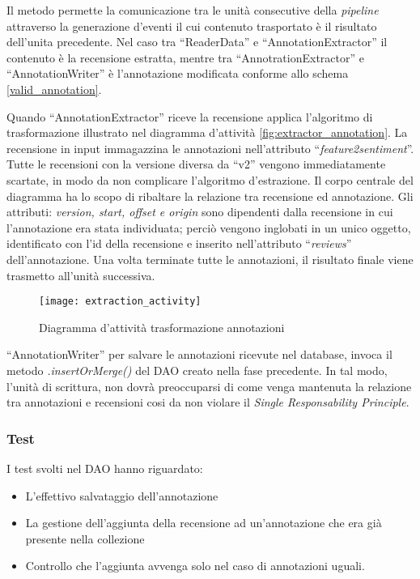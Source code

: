 Il metodo permette la comunicazione tra le unità consecutive della
\textit{pipeline} attraverso la generazione d'eventi il cui contenuto
trasportato è il risultato dell'unita precedente. Nel caso tra ``ReaderData'' e
``AnnotationExtractor'' il contenuto è la recensione estratta, mentre tra
``AnnotrationExtractor'' e ``AnnotationWriter'' è l'annotazione modificata
conforme allo schema \ref{valid_annotation}.

Quando ``AnnotationExtractor'' riceve la recensione applica l'algoritmo di
trasformazione illustrato nel diagramma d'attività
\ref{fig:extractor_annotation}. La recensione in input immagazzina le
annotazioni nell'attributo ``\textit{feature2sentiment}''. Tutte le recensioni
con la versione diversa da ``v2'' vengono immediatamente scartate, in modo da
non complicare l'algoritmo d'estrazione. Il corpo centrale del diagramma ha lo
scopo di ribaltare la relazione tra recensione ed annotazione. Gli attributi:
\textit{version, start, offset e origin} sono dipendenti dalla recensione in
cui l'annotazione era stata individuata; perciò vengono inglobati in un unico
oggetto, identificato con l'id della recensione e inserito nell'attributo
``\textit{reviews}'' dell'annotazione. Una volta terminate tutte le annotazioni,
il risultato finale viene trasmetto all'unità successiva.

\begin{figure}[H]
\begin{center}
\texttt{[image: extraction\_activity]}
\caption{
Diagramma d'attività trasformazione annotazioni
}
\label{fig:extraction_activity}
\end{center}
\end{figure}

``AnnotationWriter'' per salvare le annotazioni ricevute nel database, invoca il
metodo \textit{.insertOrMerge()} del \gls{DAO} creato nella fase precedente. In
tal modo, l'unità di scrittura, non dovrà preoccuparsi di come venga mantenuta
la relazione tra annotazioni e recensioni cosi da non violare il
\textit{Single Responsability Principle}.

\subsubsection{Test}
I test svolti nel \gls{DAO} hanno riguardato:
\begin{itemize}
\item L'effettivo salvataggio dell'annotazione
\item La gestione dell'aggiunta della recensione ad un'annotazione che era già
presente nella collezione
\item Controllo che l'aggiunta avvenga solo nel caso di annotazioni uguali.
\end{itemize}


